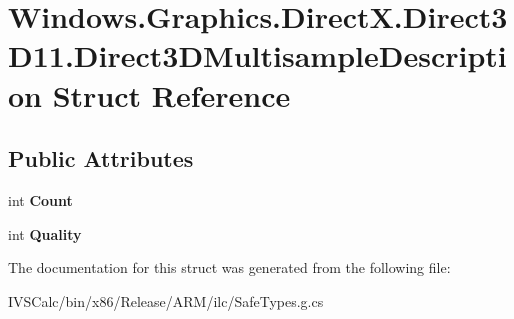 \hypertarget{struct_windows_1_1_graphics_1_1_direct_x_1_1_direct3_d11_1_1_direct3_d_multisample_description}{}\section{Windows.\+Graphics.\+Direct\+X.\+Direct3\+D11.\+Direct3\+D\+Multisample\+Description Struct Reference}
\label{struct_windows_1_1_graphics_1_1_direct_x_1_1_direct3_d11_1_1_direct3_d_multisample_description}
\subsection*{Public Attributes}
\begin{DoxyCompactItemize}
\item 
\mbox{\label{struct_windows_1_1_graphics_1_1_direct_x_1_1_direct3_d11_1_1_direct3_d_multisample_description_a4bdd61719f7318024f5f263d74c8bd2f}} 
int {\bfseries Count}
\item 
\mbox{\label{struct_windows_1_1_graphics_1_1_direct_x_1_1_direct3_d11_1_1_direct3_d_multisample_description_a6fa5ceb1a43ebf8e8f8e0507109492e7}} 
int {\bfseries Quality}
\end{DoxyCompactItemize}


The documentation for this struct was generated from the following file\+:\begin{DoxyCompactItemize}
\item 
I\+V\+S\+Calc/bin/x86/\+Release/\+A\+R\+M/ilc/Safe\+Types.\+g.\+cs\end{DoxyCompactItemize}
